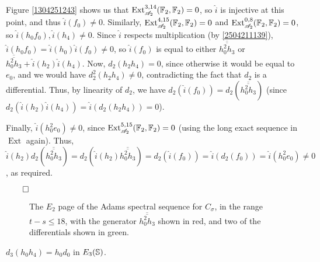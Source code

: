 \documentclass{MetricNotes2023}
\def\bb{\ensuremath\mathbb}
\def\A{\ensuremath{\mathscr{A}_2}}
\DeclareMathOperator{\Ext}{Ext}
\def\done{\begin{flushright}\vspace{-4.35ex}\(\qed\)\end{flushright}}
\begin{document}
\begin{ourproof}
Figure \ref{1304251243} shows us that \(\Ext_{\A}^{3,14}(\bb{F}_2, \bb{F}_2)=0\), so \(\hat i\) is injective at this point, and thus \(\hat i(f_0)\neq 0\). Similarly, \(\Ext_{\A}^{4,15}(\bb{F}_2, \bb{F}_2)=0\) and \(\Ext_{\A}^{0,8}(\bb{F}_2, \bb{F}_2)=0\), so \(\hat i(h_0f_0), \hat i(h_4)\neq 0\). Since \(\hat i\) respects multiplication (by \ref{2504211139}), \(\hat i(h_0f_0)=\hat i(h_0)\hat i(f_0)\neq 0\), so \(\hat i(f_0)\) is equal to either \(\overline{\overline{h_0^2h_3}}\) or \(\overline{\overline{h_0^2h_3}}+\hat i(h_2)\hat{i}(h_4)\). Now, \(d_2(h_2h_4)=0\), since otherwise it would be equal to \(e_0\), and we would have \(d_2^2(h_2h_4)\neq 0\), contradicting the fact that \(d_2\) is a differential. Thus, by linearity of \(d_2\), we have \(d_2(\hat i(f_0))=d_2(\overline{\overline{h_0^2h_3}})\) (since \(d_2(\hat i (h_2)\hat i (h_4))=\hat i(d_2(h_2h_4))=0\)).

Finally, \(\hat i(h_0^2e_0)\neq 0\), since \(\Ext_{\A}^{5,15}(\bb{F}_2, \bb{F}_2)=0\) (using the long exact sequence in \(\Ext\) again). Thus, \(\hat i(h_2)d_2(\overline{\overline{h_0^2h_3}})= d_2(\hat i(h_2)\overline{\overline{h_0^2h_3}})=
d_2(\hat i(f_0))=\hat i(d_2(f_0))=\hat i(h_0^2e_0)\neq 0\), as required. \done
\end{ourproof}

\begin{figure}
\centering

\caption{The \(E_2\) page of the Adams spectral sequence for \(C_\sigma\), in the range \(t-s\leq 18\), with the generator \(\overline{\overline{h_0^2h_3}}\) shown in red, and two of the differentials shown in green.}
\label{2504131812}
\end{figure}

\begin{theorem}
\(d_3(h_0h_4)=h_0d_0\) in \(E_3(\bb{S})\).
\end{theorem}
\end{document}
